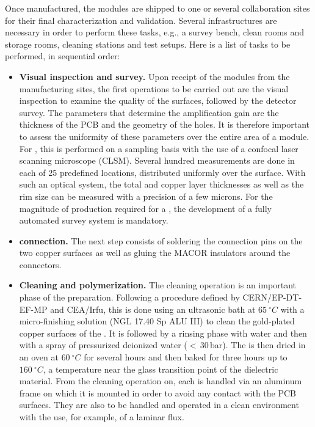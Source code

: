 Once manufactured, the  modules are shipped to one or several collaboration sites for their final characterization and validation. Several infrastructures are necessary in order to perform these tasks, e.g., a survey bench, clean rooms and storage rooms, cleaning stations and  test setups. Here is a list of tasks to be performed, in sequential order:

\begin{itemize}
\item {\bf Visual inspection and survey.} Upon receipt of the  modules from the manufacturing sites, the first operations to be carried out are the visual inspection to examine the quality of the  surfaces, %
followed by the detector survey. The parameters that determine the  amplification gain are the thickness of the PCB and the geometry of the holes. It is therefore important to assess the uniformity of these parameters over the entire area of a  module. For  , this is performed on a sampling basis with the use of a confocal laser scanning microscope (CLSM). Several hundred measurements are done in each of \num{25} predefined locations, distributed uniformly over the  surface. With such an optical system, the total  and copper layer thicknesses as well as the rim size can be measured with a precision of a few microns.  %
For the magnitude of production required for a , the development of a fully automated survey system is mandatory. 

\item {\bf {} connection.} The next step consists of soldering the  connection pins on the two  copper surfaces as well as gluing the MACOR insulators around the connectors.

\item {\bf Cleaning and polymerization.} The cleaning operation is an important phase of the  preparation. Following a procedure defined by CERN/EP-DT-EF-MP and CEA/Irfu,
 this is done using an ultrasonic bath at $\SI{65}{^\circ{}C}$ with a micro-finishing solution (NGL 17.40 Sp ALU III) to clean the gold-plated copper surfaces of the . It is followed by a rinsing phase with water and then with a spray of pressurized deionized water %
 ($<$\,30\,bar). The  is then dried in an oven 
at $\SI{60}{^\circ{}C}$  for several hours and then baked for three hours up to $\SI{160}{^\circ{}C}$, %
a temperature near the glass transition point of the dielectric material. From the cleaning operation on, each  is handled via an aluminum frame on which it is mounted in order to avoid any contact with the PCB surfaces. They are also to be %
handled and operated in a clean environment with the use, for example, of a laminar flux.  


\end{itemize}
